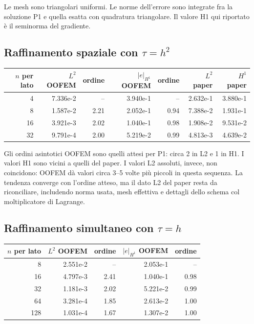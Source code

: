 \documentclass[10pt,a4paper]{article}
\begin{document}
Le mesh sono triangolari uniformi. Le norme dell'errore sono integrate fra la soluzione P1 e quella esatta con quadratura triangolare. Il valore H1 qui riportato è il seminorma del gradiente.

\subsection*{Raffinamento spaziale con \(\tau=h^2\)}
\begin{center}\small
\begin{tabular}{r r r r r r r}
\toprule
\(n\) per lato & \(L^2\) OOFEM & ordine & \(|e|_{H^1}\) OOFEM & ordine & \(L^2\) paper & \(H^1\) paper \\
\midrule
4  & 7.336e-2 & --   & 3.940e-1 & --   & 2.632e-1 & 3.880e-1 \\
8  & 1.587e-2 & 2.21 & 2.052e-1 & 0.94 & 7.388e-2 & 1.931e-1 \\
16 & 3.921e-3 & 2.02 & 1.040e-1 & 0.98 & 1.908e-2 & 9.531e-2 \\
32 & 9.791e-4 & 2.00 & 5.219e-2 & 0.99 & 4.813e-3 & 4.639e-2 \\
\bottomrule
\end{tabular}
\end{center}

Gli ordini asintotici OOFEM sono quelli attesi per P1: circa 2 in L2 e 1 in H1. I valori H1 sono vicini a quelli del paper. I valori L2 assoluti, invece, non coincidono: OOFEM dà valori circa 3--5 volte più piccoli in questa sequenza. La tendenza converge con l'ordine atteso, ma il dato L2 del paper resta da riconciliare, includendo norma usata, mesh effettiva e dettagli dello schema col moltiplicatore di Lagrange.

\subsection*{Raffinamento simultaneo con \(\tau=h\)}
\begin{center}\small
\begin{tabular}{r r r r r}
\toprule
\(n\) per lato & \(L^2\) OOFEM & ordine & \(|e|_{H^1}\) OOFEM & ordine \\
\midrule
8   & 2.551e-2 & --   & 2.053e-1 & --   \\
16  & 4.797e-3 & 2.41 & 1.040e-1 & 0.98 \\
32  & 1.181e-3 & 2.02 & 5.221e-2 & 0.99 \\
64  & 3.281e-4 & 1.85 & 2.613e-2 & 1.00 \\
128 & 1.031e-4 & 1.67 & 1.307e-2 & 1.00 \\
\bottomrule
\end{tabular}
\end{center}
\end{document}
